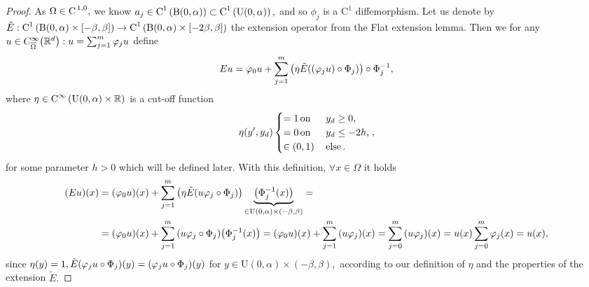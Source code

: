 \documentclass{article}
\begin{document}
\begin{proof}
	As $\Omega \in \text{C}^{\!\,\, 1,0},$ we know $a_j \in \text{C}^{1}\!\,\left(\text{B}(0,\alpha) \right)\subset \text{C}^{1}\!\,\left(\text{U}(0,\alpha) \right),$ and so $\phi_j$ is a $\text{C}^1$ diffemorphism. Let us denote by $\tilde{E}: \text{C}^{1}\!\,\left(\text{B}(0,\alpha)\times [-\beta, \beta] \right) \to \text{C}^{1}\!\,\left(\text{B}(0,\alpha)\times [-2 \beta, \beta] \right)$ the extension operator from the Flat extension lemma. Then we for any $u \in C^{\infty}_{\overline{\Omega}}\qty({\mathbb R}^d): u = \sum_{j=1}^m \varphi_j u$ define
	\[
		Eu=\varphi_0 u + \sum_{j=1}^m \qty(\eta \tilde{E}\qty((\varphi_j u) \circ \Phi_j)) \circ \Phi_j^{-1},
	\]
	where $\eta \in \text{C}^{\infty}\!\,\left(\text{U}(0,\alpha)\times {\mathbb R} \right)$ is a cut-off function
	\begin{equation*}
		\eta\qty(y',y_d)  
		\begin{cases}
			=1 \, \text{on} \, &y_d \geq 0,\\
			= 0 \, \text{on} \,& y_d \leq -2h, \\
			\in (0,1) \, &\text{else} \,.
		\end{cases},
	\end{equation*}
for some parameter $h>0$ which will be defined later.
With this definition, $\forall x \in \Omega$ it holds
\begin{align*}
	\qty(Eu)(x) &= \qty(\varphi_0 u)(x) + \sum_{j=1}^{m}\qty(\eta \tilde{E}\qty(u \varphi_j \circ \Phi_j))\underbrace{\qty(\Phi_j^{-1}(x))}_{\in \text{U}(0,\alpha)\times \qty(-\beta, \beta)} =\\
	&= \qty(\varphi_0 u)(x) + \sum_{j=1}^m \qty(u \varphi_j \circ \Phi_j)\qty(\Phi_j^{-1}(x)) = \qty(\varphi_0 u)(x) + \sum_{j=1}^m \qty(u \varphi_j)(x) = \sum_{j=0}^m \qty(u \varphi_j)(x) = u(x) \sum_{j=0}^m \varphi_j(x) = u(x),
\end{align*}
since $\eta(y) = 1, \tilde{E}\qty(\varphi_j u \circ \Phi_j) (y) = \qty(\varphi_j u \circ \Phi_j)(y)$ for $y \in \text{U}(0,\alpha) \times (-\beta, \beta), $ according to our definition of $\eta$ and the properties of the extension $\tilde{E}.$


\end{proof}
\end{document}
